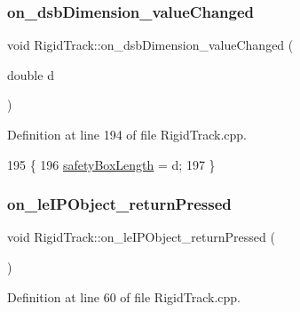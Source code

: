 \subsubsection{\texorpdfstring{on\+\_\+dsb\+Dimension\+\_\+value\+Changed}{on\_dsbDimension\_valueChanged}}
{\footnotesize\ttfamily void Rigid\+Track\+::on\+\_\+dsb\+Dimension\+\_\+value\+Changed (\begin{DoxyParamCaption}\item[{double}]{d }\end{DoxyParamCaption})\hspace{0.3cm}{\ttfamily [slot]}}



Definition at line 194 of file Rigid\+Track.\+cpp.


\begin{DoxyCode}
195 \{
196     \hyperlink{main_8cpp_a2c1b807fcb2de5a6759bd60ccae6dd7e}{safetyBoxLength} = d;
197 \}
\end{DoxyCode}
\mbox{\label{class_rigid_track_a9f037a061b2577815fc80e5e9f8d46d9}} 
\subsubsection{\texorpdfstring{on\+\_\+le\+I\+P\+Object\+\_\+return\+Pressed}{on\_leIPObject\_returnPressed}}
{\footnotesize\ttfamily void Rigid\+Track\+::on\+\_\+le\+I\+P\+Object\+\_\+return\+Pressed (\begin{DoxyParamCaption}{ }\end{DoxyParamCaption})\hspace{0.3cm}{\ttfamily [slot]}}



Definition at line 60 of file Rigid\+Track.\+cpp.


